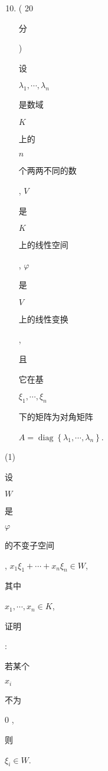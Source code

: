 \documentclass[10pt]{article}
\begin{document}
\begin{enumerate}
  \setcounter{enumi}{9}
  \item ( 20 \begin{CJK}{UTF8}{mj}分\end{CJK}) \begin{CJK}{UTF8}{mj}设\end{CJK} $\lambda_{1}, \cdots, \lambda_{n}$ \begin{CJK}{UTF8}{mj}是数域\end{CJK} $K$ \begin{CJK}{UTF8}{mj}上的\end{CJK} $n$ \begin{CJK}{UTF8}{mj}个两两不同的数\end{CJK}, $V$ \begin{CJK}{UTF8}{mj}是\end{CJK} $K$ \begin{CJK}{UTF8}{mj}上的线性空间\end{CJK}, $\varphi$ \begin{CJK}{UTF8}{mj}是\end{CJK} $V$ \begin{CJK}{UTF8}{mj}上的线性变换\end{CJK}, \begin{CJK}{UTF8}{mj}且\end{CJK} \begin{CJK}{UTF8}{mj}它在基\end{CJK} $\xi_{1}, \cdots, \xi_{n}$ \begin{CJK}{UTF8}{mj}下的矩阵为对角矩阵\end{CJK} $A=\operatorname{diag}\left\{\lambda_{1}, \cdots, \lambda_{n}\right\}$.
\end{enumerate}
(1) \begin{CJK}{UTF8}{mj}设\end{CJK} $W$ \begin{CJK}{UTF8}{mj}是\end{CJK} $\varphi$ \begin{CJK}{UTF8}{mj}的不变子空间\end{CJK}, $x_{1} \xi_{1}+\cdots+x_{n} \xi_{n} \in W$, \begin{CJK}{UTF8}{mj}其中\end{CJK} $x_{1}, \cdots, x_{n} \in K$, \begin{CJK}{UTF8}{mj}证明\end{CJK}: \begin{CJK}{UTF8}{mj}若某个\end{CJK} $x_{i}$ \begin{CJK}{UTF8}{mj}不为\end{CJK} 0 , \begin{CJK}{UTF8}{mj}则\end{CJK} $\xi_{i} \in W$.
\end{document}
